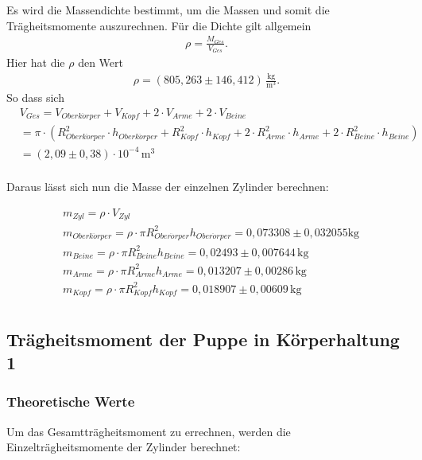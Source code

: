 Es wird die Massendichte bestimmt, um die Massen und somit die Trägheitsmomente auszurechnen.
Für die Dichte gilt allgemein
\begin{align*}
  \rho = \frac{M_{Ges}}{V_{Ges}} .
\end{align*}
Hier hat die $\rho$ den Wert
\begin{align*}
  \rho = (805{,}263 \pm 146{,}412) \, \mathrm{\frac{kg}{m^3}}.
\end{align*}
So dass sich
\begin{align*}
&  V_{Ges} = V_{Oberk\ddot{o}rper} + V_{Kopf} + 2 \cdot V_{Arme} + 2 \cdot V_{Beine} \\
&  = \pi \cdot \left(R_{Oberk\ddot{o}rper}^2  \cdot h_{Oberk\ddot{o}rper} + R_{Kopf}^2 \cdot h_{Kopf} + 2 \cdot R_{Arme}^2 \cdot h_{Arme} +2 \cdot R_{Beine}^2 \cdot h_{Beine} \right) \\
&  = (2{,}09 \pm 0{,}38) \cdot 10^{-4} \, \mathrm{m^3} \\
\end{align*}

Daraus lässt sich nun die Masse der einzelnen Zylinder berechnen:

\begin{align*}
  &  m_{Zyl} = \rho \cdot V_{Zyl} \\
  &  m_{Oberk\ddot{o}rper} = \rho \cdot \pi R_{Ober\ddot{o}rper}^2 h_{Ober\ddot{o}rper} = 0{,}073308 \pm 0{,}032055 \mathrm{kg} \\
  &  m_{Beine} = \rho \cdot \pi R_{Beine}^2 h_{Beine} = 0{,}02493 \pm 0{,}007644 \, \mathrm{kg} \\
  &  m_{Arme} = \rho \cdot \pi R_{Arme}^2 h_{Arme} = 0{,}013207 \pm 0{,}00286 \, \mathrm{kg} \\
  &  m_{Kopf} = \rho \cdot \pi R_{Kopf}^2 h_{Kopf} = 0{,}018907 \pm 0{,}00609 \, \mathrm{kg} \\
\end{align*}

\subsection{Trägheitsmoment der Puppe in Körperhaltung 1}
\label{sec:TraegheitsmomentderPuppeinKoerperhaltung 1}
\subsubsection{Theoretische Werte}

Um das Gesamtträgheitsmoment zu errechnen, werden die Einzelträgheitsmomente der Zylinder berechnet:

